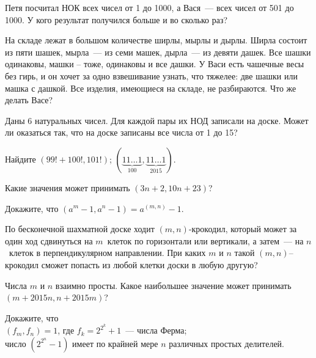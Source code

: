 \begin{problems}

\item
Петя посчитал НОК всех чисел от 1 до 1000, а Вася~--- всех чисел
от 501 до 1000.
У кого результат получился больше и во сколько раз?

\item
На складе лежат в большом количестве ширлы, мырлы и дырлы.
Ширла состоит из пяти шашек, мырла~--- из семи машек,
дырла~--- из девяти дашек.
Все шашки одинаковы, машки -- тоже, одинаковы и все дашки.
У Васи есть чашечные весы без гирь, и он хочет за одно взвешивание узнать, что
тяжелее: две шашки или машка с дашкой.
Все изделия, имеющиеся на складе, не разбираются.
Что же делать Васе?

\item
Даны 6 натуральных чисел.
Для каждой пары их НОД записали на доске.
Может ли оказаться так, что на доске записаны все числа от 1 до 15?

\iffalse
\item
Про натуральные числа $a$ и $b$ известно, что $a^2 + b^2$ делится на $a b$.
Докажите, что $a = b$.
\fi

\item
Найдите
\quad
\subproblem $(99! + 100!, 101!)$;
\quad
\subproblem $(\underbrace{11\ldots 1}_{100}, \underbrace{11\ldots 1}_{2015})$.

\item
Какие значения может принимать $(3 n + 2, 10 n + 23)$?

\item
Докажите, что $(a^m - 1, a^n - 1) = a^{(m,n)} - 1$.

\item
По бесконечной шахматной доске ходит $(m, n)$-крокодил, который может за один
ход сдвинуться на $m$~клеток по горизонтали или вертикали, а затем~---
на $n$~клеток в перпендикулярном направлении.
При каких $m$ и $n$ такой $(m,n)$--крокодил сможет попасть из любой клетки
доски в любую другую?

\item
Числа $m$ и $n$ взаимно просты.
Какое наибольшее значение может принимать $(m + 2015 n, n + 2015 m)$?

\item
Докажите, что
\\
\subproblem
$(f_m, f_n) = 1$, где $f_k = 2^{2^k} + 1$~--- числа Ферма;
\\
\subproblem
число $(2^{2^n} - 1)$ имеет по крайней мере $n$ различных простых делителей.

\end{problems}

